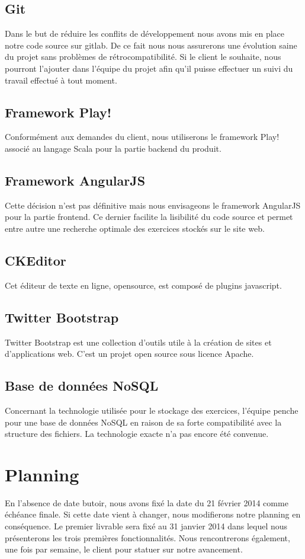 \subsection{Git}
Dans le but de réduire les conflits de développement nous avons mis en place notre code source sur gitlab. De ce fait nous nous assurerons une évolution saine du projet sans problèmes de rétrocompatibilité. Si le client le souhaite, nous pourront l'ajouter dans l'équipe du projet afin qu'il puisse effectuer un suivi du travail effectué à tout moment.

\subsection{Framework Play!}
Conformément aux demandes du client, nous utiliserons le framework Play! associé au langage Scala pour la partie backend du produit.

\subsection{Framework AngularJS}
Cette décision n'est pas définitive mais nous envisageons le framework AngularJS pour la partie frontend. Ce dernier facilite la lisibilité du code source et permet entre autre une recherche optimale des exercices stockés sur le site web.

\subsection{CKEditor}
Cet éditeur de texte en ligne, opensource, est composé de plugins javascript.

\subsection{Twitter Bootstrap}
Twitter Bootstrap est une collection d'outils utile à la création de sites et d'applications web. C'est un projet open source sous licence Apache.

\subsection{Base de données NoSQL}
Concernant la technologie utilisée pour le stockage des exercices, l'équipe penche pour une base de données NoSQL en raison de sa forte compatibilité avec la structure des fichiers. La technologie exacte n'a pas encore été convenue.

\newpage
\section{Planning}

En l'absence de date butoir, nous avons fixé la date du 21 février 2014 comme échéance finale. Si cette date vient à changer, nous modifierons notre planning en conséquence. Le premier livrable sera fixé au 31 janvier 2014 dans lequel nous présenterons les trois premières fonctionnalités. Nous rencontrerons également, une fois par semaine, le client pour statuer sur notre avancement.      

